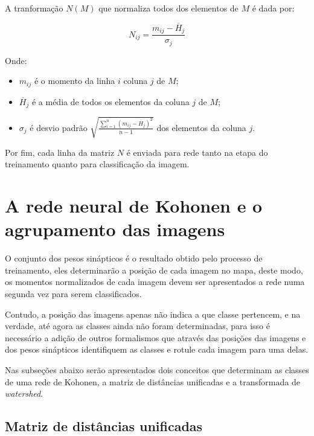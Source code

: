 A tranformação $ N(M) $ que normaliza todos dos elementos de $ M $ é dada por:

\begin{equation}\label{eq:momentos_transformacao}
  N_{ij} = \frac{m_{ij} - \overline{H}_j}{\sigma_j}
\end{equation}

Onde:

\begin{itemize}
\item $ m_{ij} $ é o momento da linha $ i $ coluna $ j $ de $ M $;
\item $ \overline{H}_j $ é a média de todos os elementos da coluna $ j $ de $ M $;
\item $ \sigma_j $ é desvio padrão $ \sqrt{\frac{\sum_{i=1}^n (m_{ij} - \overline{H}_j)^2}{n - 1}} $
      dos elementos da coluna $ j $.
\end{itemize}

Por fim, cada linha da matriz $ N $ é enviada para rede tanto na etapa do treinamento
quanto para classificação da imagem.

\section{A rede neural de Kohonen e o agrupamento das imagens}\label{sec:rede_kohonen_imagens}

O conjunto dos pesos sinápticos é o resultado obtido pelo processo de
treinamento, eles determinarão a posição de cada imagem no mapa, deste modo, os
momentos normalizados de cada imagem devem ser apresentados a rede numa segunda
vez para serem classificados.

Contudo, a posição das imagens apenas não indica a que classe pertencem, e na
verdade, até agora as classes ainda não foram determinadas, para isso é
necessário a adição de outros formalismos que através das posições das imagens
e dos pesos sinápticos identifiquem as classes e rotule cada imagem para uma
delas.

Nas subseções abaixo serão apresentados dois conceitos que determinam as classes
de uma rede de Kohonen, a matriz de distâncias unificadas e a transformada de
\textit{watershed}.

\subsection{Matriz de distâncias unificadas}\label{sec:u_matriz}

